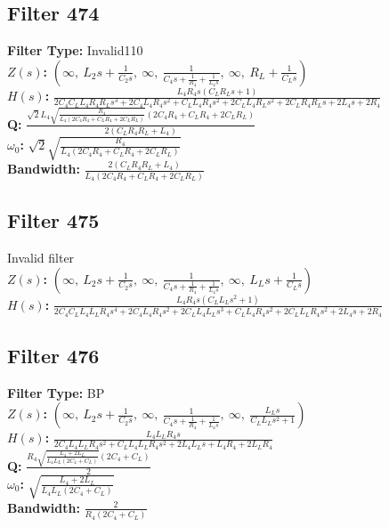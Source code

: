 \documentclass{article}
\begin{document}
\subsection*{Filter 474}
\textbf{Filter Type:} Invalid110 \\ 
\textbf{$Z(s)$:} $\left( \infty, \  L_{2} s + \frac{1}{C_{2} s}, \  \infty, \  \frac{1}{C_{4} s + \frac{1}{R_{4}} + \frac{1}{L_{4} s}}, \  \infty, \  R_{L} + \frac{1}{C_{L} s}\right)$ \\ 
\textbf{$H(s)$:} $\frac{L_{4} R_{4} s \left(C_{L} R_{L} s + 1\right)}{2 C_{4} C_{L} L_{4} R_{4} R_{L} s^{3} + 2 C_{4} L_{4} R_{4} s^{2} + C_{L} L_{4} R_{4} s^{2} + 2 C_{L} L_{4} R_{L} s^{2} + 2 C_{L} R_{4} R_{L} s + 2 L_{4} s + 2 R_{4}}$ \\ 
\textbf{Q:} $\frac{\sqrt{2} L_{4} \sqrt{\frac{R_{4}}{L_{4} \left(2 C_{4} R_{4} + C_{L} R_{4} + 2 C_{L} R_{L}\right)}} \left(2 C_{4} R_{4} + C_{L} R_{4} + 2 C_{L} R_{L}\right)}{2 \left(C_{L} R_{4} R_{L} + L_{4}\right)}$ \\ 
\textbf{$\omega_0$:} $\sqrt{2} \sqrt{\frac{R_{4}}{L_{4} \left(2 C_{4} R_{4} + C_{L} R_{4} + 2 C_{L} R_{L}\right)}}$ \\ 
\textbf{Bandwidth:} $\frac{2 \left(C_{L} R_{4} R_{L} + L_{4}\right)}{L_{4} \left(2 C_{4} R_{4} + C_{L} R_{4} + 2 C_{L} R_{L}\right)}$ \\ 
\subsection*{Filter 475}
Invalid filter \\ 
\textbf{$Z(s)$:} $\left( \infty, \  L_{2} s + \frac{1}{C_{2} s}, \  \infty, \  \frac{1}{C_{4} s + \frac{1}{R_{4}} + \frac{1}{L_{4} s}}, \  \infty, \  L_{L} s + \frac{1}{C_{L} s}\right)$ \\ 
\textbf{$H(s)$:} $\frac{L_{4} R_{4} s \left(C_{L} L_{L} s^{2} + 1\right)}{2 C_{4} C_{L} L_{4} L_{L} R_{4} s^{4} + 2 C_{4} L_{4} R_{4} s^{2} + 2 C_{L} L_{4} L_{L} s^{3} + C_{L} L_{4} R_{4} s^{2} + 2 C_{L} L_{L} R_{4} s^{2} + 2 L_{4} s + 2 R_{4}}$ \\ 
\subsection*{Filter 476}
\textbf{Filter Type:} BP \\ 
\textbf{$Z(s)$:} $\left( \infty, \  L_{2} s + \frac{1}{C_{2} s}, \  \infty, \  \frac{1}{C_{4} s + \frac{1}{R_{4}} + \frac{1}{L_{4} s}}, \  \infty, \  \frac{L_{L} s}{C_{L} L_{L} s^{2} + 1}\right)$ \\ 
\textbf{$H(s)$:} $\frac{L_{4} L_{L} R_{4} s}{2 C_{4} L_{4} L_{L} R_{4} s^{2} + C_{L} L_{4} L_{L} R_{4} s^{2} + 2 L_{4} L_{L} s + L_{4} R_{4} + 2 L_{L} R_{4}}$ \\ 
\textbf{Q:} $\frac{R_{4} \sqrt{\frac{L_{4} + 2 L_{L}}{L_{4} L_{L} \left(2 C_{4} + C_{L}\right)}} \left(2 C_{4} + C_{L}\right)}{2}$ \\ 
\textbf{$\omega_0$:} $\sqrt{\frac{L_{4} + 2 L_{L}}{L_{4} L_{L} \left(2 C_{4} + C_{L}\right)}}$ \\ 
\textbf{Bandwidth:} $\frac{2}{R_{4} \left(2 C_{4} + C_{L}\right)}$ \\ 
\end{document}
